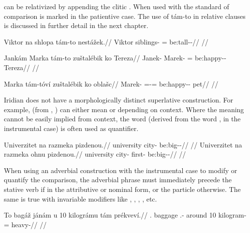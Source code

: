  can be relativized by appending the clitic .
When used with  the standard of comparison is marked in the
patientive case. The use of tám-to in relative clauses is
discussed in further detail in the next chapter.

\ex
\begingl
\gla Viktor na shlopa tám-to nestážek.//
\glb Viktor \Loc{} siblings-\Acc{} \Comp{}=\Rz{} be:tall-\Av{}-\Pf{}//
\glft {}//
\endgl
\xe

\ex
\begingl
\gla Jankám Marka tám-to zuštalébik ko Tereza//
\glb Janek-\Agt{} Marek-\Acc{} \Comp{}=\Rz{} be:happy-\Ben{}-\Pf{} \Lnk{} Tereza//
\glft {}//
\endgl
\xe

\ex
\begingl
\gla Marka tám-tóví zuštalébik ko oblašc//
\glb Marek-\Acc{} \Comp{}=\Rz{}-\Gen{}= be:happy-\Ben{}-\Pf{} \Lnk{} pet//
\glft {}//
\endgl
\xe

Iridian does not have a morphologically distinct superlative construction. For
example,  (from , ) can either mean
 or  depending on context. Where the meaning cannot
be easily implied from context, the word  (derived from the word
,  in the instrumental case) is often used as quantifier.

\pex
\a
\begingl
\gla Univerzitet na razmeka pizdenou.//
\glb university \Loc{} city-\Acc{} be:big-\Comp{}-\Nz{}//
\glft {}//
\endgl
\a
\begingl
\gla Univerzitet na razmeka ohnu pizdenou.//
\glb university \Loc{} city-\Acc{} first-\Ins{} be:big-\Comp{}-\Nz{}//
\glft {}//
\endgl
\xe

When using an adverbial construction with the instrumental case to modify or
quantify the comparison, the adverbial phrase must immediately precede the
stative verb if in the attributive or nominal form, or the particle 
otherwise. The same is true with invariable modifiers like ,
, , , etc.

\ex
\begingl
\gla To bagáž jánám u 10 kilográmu tám prékveví.//
\glb \Dem{}.\Prox{} baggage \Dem{}.\Med{}-\Agt{} around 10 kilogram-\Ins{} \Comp{}= heavy-\Cont{}//
\glft {}//
\endgl
\xe

